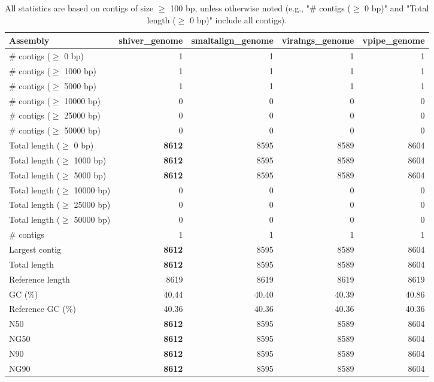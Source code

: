 \documentclass[12pt,a4paper]{article}
\begin{document}
\begin{table}[ht]
\begin{center}
\caption{All statistics are based on contigs of size $\geq$ 100 bp, unless otherwise noted (e.g., "\# contigs ($\geq$ 0 bp)" and "Total length ($\geq$ 0 bp)" include all contigs).}
\begin{tabular}{|l*{4}{|r}|}
\hline
Assembly & shiver\_genome & smaltalign\_genome & viralngs\_genome & vpipe\_genome \\ \hline
\# contigs ($\geq$ 0 bp) & 1 & 1 & 1 & 1 \\ \hline
\# contigs ($\geq$ 1000 bp) & 1 & 1 & 1 & 1 \\ \hline
\# contigs ($\geq$ 5000 bp) & 1 & 1 & 1 & 1 \\ \hline
\# contigs ($\geq$ 10000 bp) & 0 & 0 & 0 & 0 \\ \hline
\# contigs ($\geq$ 25000 bp) & 0 & 0 & 0 & 0 \\ \hline
\# contigs ($\geq$ 50000 bp) & 0 & 0 & 0 & 0 \\ \hline
Total length ($\geq$ 0 bp) & {\bf 8612} & 8595 & 8589 & 8604 \\ \hline
Total length ($\geq$ 1000 bp) & {\bf 8612} & 8595 & 8589 & 8604 \\ \hline
Total length ($\geq$ 5000 bp) & {\bf 8612} & 8595 & 8589 & 8604 \\ \hline
Total length ($\geq$ 10000 bp) & 0 & 0 & 0 & 0 \\ \hline
Total length ($\geq$ 25000 bp) & 0 & 0 & 0 & 0 \\ \hline
Total length ($\geq$ 50000 bp) & 0 & 0 & 0 & 0 \\ \hline
\# contigs & 1 & 1 & 1 & 1 \\ \hline
Largest contig & {\bf 8612} & 8595 & 8589 & 8604 \\ \hline
Total length & {\bf 8612} & 8595 & 8589 & 8604 \\ \hline
Reference length & 8619 & 8619 & 8619 & 8619 \\ \hline
GC (\%) & 40.44 & 40.40 & 40.39 & 40.86 \\ \hline
Reference GC (\%) & 40.36 & 40.36 & 40.36 & 40.36 \\ \hline
N50 & {\bf 8612} & 8595 & 8589 & 8604 \\ \hline
NG50 & {\bf 8612} & 8595 & 8589 & 8604 \\ \hline
N90 & {\bf 8612} & 8595 & 8589 & 8604 \\ \hline
NG90 & {\bf 8612} & 8595 & 8589 & 8604 \\ \hline

\end{tabular}
\end{center}
\end{table}
\end{document}

